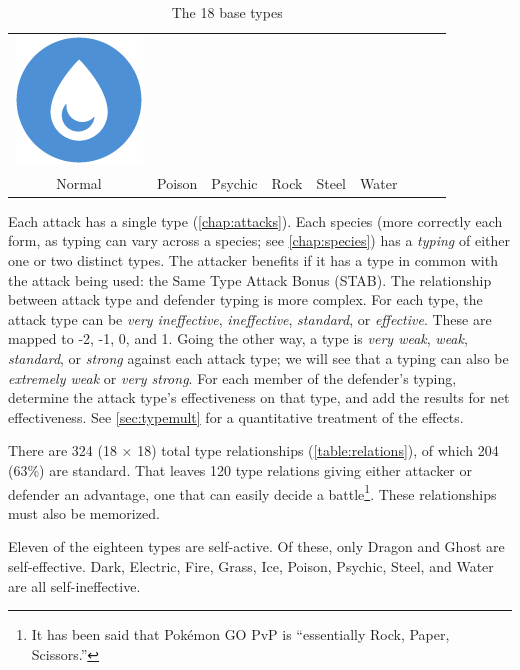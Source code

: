 \begin{table}[ht!]
\begin{center}
\begin{tabular}{c c c c c c c c c}
  \includegraphics[scale=.25]{images/water.png} \\
  Normal & Poison & Psychic & Rock & Steel & Water \\
\end{tabular}
\end{center}
\caption{The 18 base types\label{table:basetypes}}
\end{table}

Each attack has a single type (\autoref{chap:attacks}).
Each species (more correctly each form, as typing can vary across a species; see \autoref{chap:species})
  has a \textit{typing} of either one or two distinct types.
The attacker benefits if it has a type in common with the attack being used:
  the Same Type Attack Bonus (STAB).
The relationship between attack type and defender typing is more complex.
For each type, the attack type can be \textit{very ineffective},
  \textit{ineffective}, \textit{standard}, or \textit{effective}.
These are mapped to -2, -1, 0, and 1.
Going the other way, a type is \textit{very weak}, \textit{weak},
  \textit{standard}, or \textit{strong} against each attack type;
  we will see that a typing can also be \textit{extremely weak} or
  \textit{very strong}.
For each member of the defender's typing, determine the attack type's effectiveness
  on that type, and add the results for net effectiveness.
See \autoref{sec:typemult} for a quantitative treatment of the effects.

There are 324 (18 × 18) total type relationships (\autoref{table:relations}),
  of which 204 (63\%) are standard.
That leaves 120 type relations giving either attacker or defender an advantage,
  one that can easily decide a battle\footnote{It has been said that Pokémon GO PvP is ``essentially Rock, Paper, Scissors.''}.
These relationships must also be memorized.



Eleven of the eighteen types are self-active.
Of these, only Dragon and Ghost are self-effective.
Dark, Electric, Fire, Grass, Ice, Poison, Psychic, Steel, and Water are all self-ineffective.%

